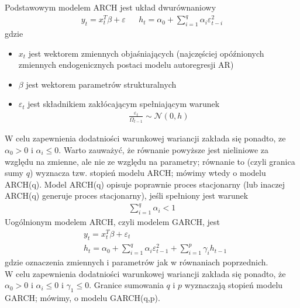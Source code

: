 Podstawowym modelem ARCH jest układ dwurównaniowy
\begin{align*}
y_t=x_t^T\beta+\varepsilon
&&
h_t=\alpha_0+\sum_{i=1}^{q}\alpha_i\varepsilon_{t-i}^2
\end{align*}
gdzie
\begin{itemize}
\item $ x_t $ jest wektorem zmiennych objaśniających (najczęściej opóźnionych zmiennych endogenicznych postaci modelu autoregresji AR)
\item $ \beta  $ jest wektorem parametrów strukturalnych
\item $ \varepsilon_t $ jest składnikiem zakłócającym spełniającym warunek 
\begin{gather*}
\frac{\varepsilon_{t}}{\Omega_{t-1}}\sim\mathcal N(0,h)
\end{gather*}
\end{itemize}
W celu zapewnienia dodatniości warunkowej wariancji zakłada się ponadto, ze $ \alpha_0>0 $ i $ \alpha_i\le0  $. Warto zauważyć, że równanie powyższe jest nieliniowe za względu na zmienne, ale nie ze względu na parametry; równanie to (czyli granica sumy $ q $) wyznacza tzw. stopień modelu ARCH; mówimy wtedy o modelu ARCH(q). Model ARCH(q) opisuje poprawnie proces stacjonarny (lub inaczej ARCH(q) generuje proces stacjonarny), jeśli spełniony jest warunek
\begin{gather*}
\sum_{i=1}^{q}\alpha_i<1
\end{gather*}
Uogólnionym modelem ARCH, czyli modelem GARCH, jest
\begin{align*}
&y_t=x_t^T\beta+\varepsilon_t\\
&h_t=\alpha_0+\sum_{i=1}^{q}\alpha_i\varepsilon_{t-1}^2+\sum_{i=1}^{p}\gamma_ih_{t-1}
\end{align*}
gdzie oznaczenia zmiennych i parametrów jak w równaniach poprzednich.\\
W celu zapewnienia dodatniości warunkowej wariancji zakłada się ponadto, że $ \alpha_0>0 $ i $ \alpha_i\le0  $ i $ \gamma_1\le0  $. Granice sumowania $ q $ i $ p $ wyznaczają stopień modelu GARCH; mówimy, o modelu GARCH(q,p).

